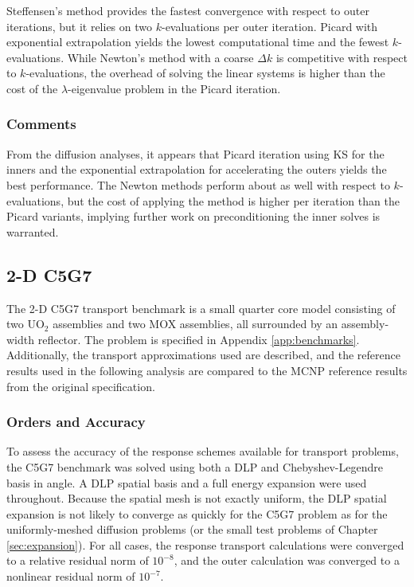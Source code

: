 Steffensen's method provides the fastest convergence with respect to 
outer iterations, but it relies on two $k$-evaluations per outer iteration.
Picard with exponential extrapolation yields the lowest computational 
time and the fewest $k$-evaluations.  While Newton's method with a 
coarse $\Delta k$ is competitive with respect to $k$-evaluations, the 
overhead of solving the linear systems is higher than the cost of the 
$\lambda$-eigenvalue problem in the Picard iteration.


\subsubsection{Comments}

From the diffusion analyses, it appears that Picard iteration using 
KS for the inners and the exponential extrapolation for accelerating 
the outers yields the best performance.  The Newton methods perform 
about as well with respect to $k$-evaluations, but the cost of 
applying the method is higher per iteration than the Picard variants,
implying further work on preconditioning the inner solves is warranted.

\subsection{2-D C5G7}


The 2-D C5G7 transport benchmark is a small quarter core 
model consisting of two UO$_2$ assemblies and two MOX
assemblies, all surrounded by an assembly-width reflector.
The problem is specified in Appendix \ref{app:benchmarks}.  Additionally,
the transport approximations used are described, and 
the \Detran reference results used in the following analysis are compared 
to the MCNP reference results from the original specification.  
 
\subsubsection{Orders and Accuracy}
 
To assess the accuracy of the response schemes available for transport 
problems, the C5G7 benchmark was solved using both a DLP and 
Chebyshev-Legendre basis in angle. A DLP spatial basis and a full 
energy expansion were used throughout.  Because the 
spatial mesh is not exactly uniform, the DLP spatial expansion is not 
likely to converge as quickly for the C5G7 problem as for the 
uniformly-meshed diffusion problems (or the small test problems
of Chapter \ref{sec:expansion}).  For all cases, 
the response transport calculations were converged to 
a relative residual norm of $10^{-8}$, and the outer calculation was 
converged to a nonlinear residual norm of $10^{-7}$.

